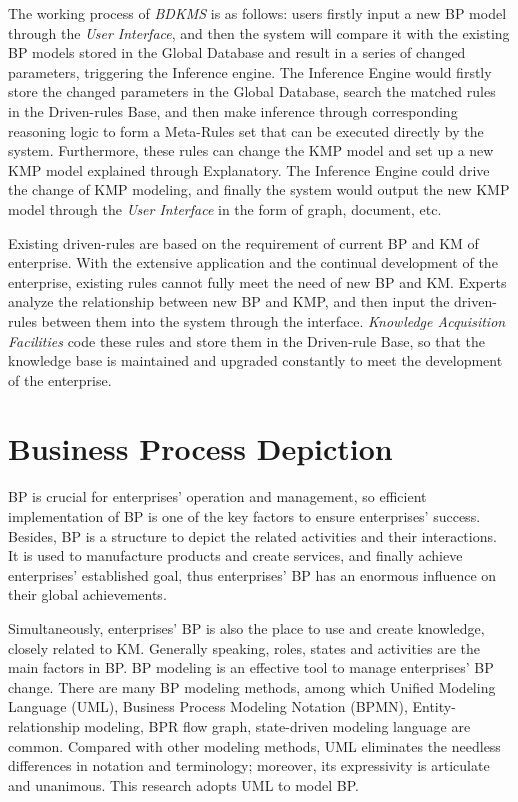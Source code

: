 \documentclass{elsarticle}
\begin{document}
\textrm{The working process of }\textrm{\textit{BDKMS}}\textrm{ is as
follows: users firstly input a new BP model through the
}\textrm{\textit{User Interface}}\textrm{, and then the system will
compare it with the existing BP models stored in the Global Database
and result in a series of changed parameters, triggering the Inference
engine. The Inference Engine would firstly store the changed parameters
in the Global Database, search the matched rules in the Driven-rules
Base, and then make inference through corresponding reasoning logic to
form a Meta-Rules set that can be executed directly by the system.
Furthermore, these rules can change the KMP model and set up a new KMP
model explained through Explanatory. The Inference Engine could drive
the change of KMP modeling, and finally the system would output the
new KMP model through the }\textrm{\textit{User Interface}}\textrm{ in
the form of graph, document, etc.}


\textrm{Existing driven-rules are based on the requirement of current BP
and KM of enterprise. With the extensive application and the
continual development of the enterprise, existing rules cannot fully
meet the need of new BP and KM. Experts analyze the relationship
between new BP and KMP, and then input the driven-rules between them
into the system through the interface. }\textrm{\textit{Knowledge
Acquisition Facilities}}\textrm{ code these rules and store them in the
Driven-rule Base, so that the knowledge base is maintained and upgraded
constantly to meet the development of the enterprise.}

\section{ Business Process
Depiction}
\label{sec:busin-proc-depict-1}

\textrm{BP is crucial for enterprises' operation and
management, so efficient implementation of BP is one of the key factors
to ensure enterprises' success. Besides, BP is a structure to depict
the related activities and their interactions. It is used to
manufacture products and create services, and finally achieve
enterprises' established goal, thus
enterprises' BP has an enormous influence on their
global achievements\cite{hammer2003reengineering,kueng1997goal}.}


\textrm{Simultaneously, enterprises' BP is also the
place to use and create knowledge, closely related to KM. Generally
speaking, roles, states and activities are the main factors in BP. BP
modeling is an effective tool to manage enterprises'
BP change\cite{chung2003knowledge}. There are many BP modeling methods, among which Unified
Modeling Language (UML), Business Process Modeling Notation (BPMN),
Entity-relationship modeling, BPR flow graph, state-driven modeling
language are common. Compared with other modeling methods, UML
eliminates the needless differences in notation and terminology;
moreover, its expressivity is articulate and unanimous.  This research
adopts UML to model BP.}
\end{document}
